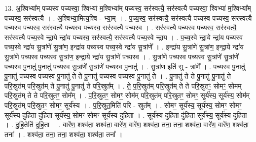 \documentclass[17pt]{extarticle}
\begin{document}
13. अ॒श्विभ्या᳚म् पच्यस्व पच्यस्वा॒ श्विभ्या॑ म॒श्विभ्या᳚म् पच्यस्व॒ सर॑स्वत्यै॒ सर॑स्वत्यै पच्यस्वा॒ श्विभ्या॑ म॒श्विभ्या᳚म् पच्यस्व॒ सर॑स्वत्यै । . अ॒श्विभ्या॒मित्य॒श्वि - भ्या॒म् । . प॒च्य॒स्व॒ सर॑स्वत्यै॒ सर॑स्वत्यै पच्यस्व पच्यस्व॒ सर॑स्वत्यै पच्यस्व पच्यस्व॒ सर॑स्वत्यै पच्यस्व पच्यस्व॒ सर॑स्वत्यै पच्यस्व । . सर॑स्वत्यै पच्यस्व पच्यस्व॒ सर॑स्वत्यै॒ सर॑स्वत्यै पच्य॒स्वे न्द्रा॒ये न्द्रा॑य पच्यस्व॒ सर॑स्वत्यै॒ सर॑स्वत्यै पच्य॒स्वे न्द्रा॑य । . प॒च्य॒स्वे न्द्रा॒ये न्द्रा॑य पच्यस्व पच्य॒स्वे न्द्रा॑य सु॒त्रांणे॑ सु॒त्रांण॒ इन्द्रा॑य पच्यस्व पच्य॒स्वे न्द्रा॑य सु॒त्रांणे᳚ । . इन्द्रा॑य सु॒त्रांणे॑ सु॒त्रांण॒ इन्द्रा॒ये न्द्रा॑य सु॒त्रांणे॑ पच्यस्व पच्यस्व सु॒त्रांण॒ इन्द्रा॒ये न्द्रा॑य सु॒त्रांणे॑ पच्यस्व । . सु॒त्रांणे॑ पच्यस्व पच्यस्व सु॒त्रांणे॑ सु॒त्रांणे॑ पच्यस्व पु॒नातु॑ पु॒नातु॑ पच्यस्व सु॒त्रांणे॑ सु॒त्रांणे॑ पच्यस्व पु॒नातु॑ । . सु॒त्रांण॒ इति॑ सु - त्रांणे᳚ । . प॒च्य॒स्व॒ पु॒नातु॑ पु॒नातु॑ पच्यस्व पच्यस्व पु॒नातु॑ ते ते पु॒नातु॑ पच्यस्व पच्यस्व पु॒नातु॑ ते । . पु॒नातु॑ ते ते पु॒नातु॑ पु॒नातु॑ ते परि॒स्रुत॑म् परि॒स्रुत॑म् ते पु॒नातु॑ पु॒नातु॑ ते परि॒स्रुत᳚म् । . ते॒ प॒रि॒स्रुत॑म् परि॒स्रुत॑म् ते ते परि॒स्रुतꣳ॒॒ सोमꣳ॒॒ सोम॑म् परि॒स्रुत॑म् ते ते परि॒स्रुतꣳ॒॒ सोम᳚म् । . प॒रि॒स्रुतꣳ॒॒ सोमꣳ॒॒ सोम॑म् परि॒स्रुत॑म् परि॒स्रुतꣳ॒॒ सोमꣳ॒॒ सूर्य॑स्य॒ सूर्य॑स्य॒ सोम॑म् परि॒स्रुत॑म् परि॒स्रुतꣳ॒॒ सोमꣳ॒॒ सूर्य॑स्य । . प॒रि॒स्रुत॒मिति॑ परि - स्रुत᳚म् । . सोमꣳ॒॒ सूर्य॑स्य॒ सूर्य॑स्य॒ सोमꣳ॒॒ सोमꣳ॒॒ सूर्य॑स्य दुहि॒ता दु॑हि॒ता सूर्य॑स्य॒ सोमꣳ॒॒ सोमꣳ॒॒ सूर्य॑स्य दुहि॒ता । . सूर्य॑स्य दुहि॒ता दु॑हि॒ता सूर्य॑स्य॒ सूर्य॑स्य दुहि॒ता । . दु॒हि॒तेति॑ दुहि॒ता । . वारे॑ण॒ शश्व॑ता॒ शश्व॑ता॒ वारे॑ण॒ वारे॑ण॒ शश्व॑ता॒ तना॒ तना॒ शश्व॑ता॒ वारे॑ण॒ वारे॑ण॒ शश्व॑ता॒ तना᳚ । . शश्व॑ता॒ तना॒ तना॒ शश्व॑ता॒ शश्व॑ता॒ तना᳚ । \newline
\end{document}
